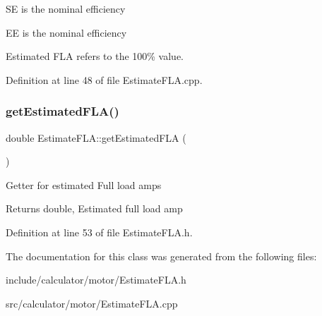 SE is the nominal efficiency

EE is the nominal efficiency

Estimated F\+LA refers to the 100\% value. 

Definition at line 48 of file Estimate\+F\+L\+A.\+cpp.

\mbox{\label{class_estimate_f_l_a_a84bebf788da566929b85d3deb8fd9755}} 
\subsubsection{\texorpdfstring{get\+Estimated\+F\+L\+A()}{getEstimatedFLA()}}
{\footnotesize\ttfamily double Estimate\+F\+L\+A\+::get\+Estimated\+F\+LA (\begin{DoxyParamCaption}{ }\end{DoxyParamCaption})\hspace{0.3cm}{\ttfamily [inline]}}

Getter for estimated Full load amps \begin{DoxyReturn}{Returns}
double, Estimated full load amp 
\end{DoxyReturn}


Definition at line 53 of file Estimate\+F\+L\+A.\+h.



The documentation for this class was generated from the following files\+:\begin{DoxyCompactItemize}
\item 
include/calculator/motor/Estimate\+F\+L\+A.\+h\item 
src/calculator/motor/Estimate\+F\+L\+A.\+cpp\end{DoxyCompactItemize}
